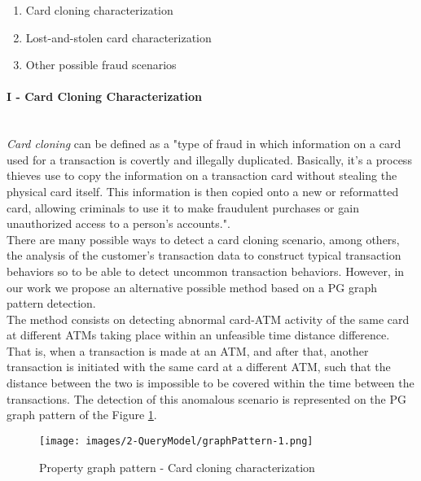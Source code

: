 \begin{enumerate}
\renewcommand{\labelenumi}{\Roman{enumi}.} %
    \item Card cloning characterization
    \item Lost-and-stolen card characterization
    \item Other possible fraud scenarios
\end{enumerate}


\paragraph{I - Card Cloning Characterization\\\\}

\emph{Card cloning} can be defined as a "type of fraud in which information on a card used for a transaction is covertly and illegally duplicated. Basically, it’s a process thieves use to copy the information on a transaction card without stealing the physical card itself. This information is then copied onto a new or reformatted card, allowing criminals to use it to make fraudulent purchases or gain unauthorized access to a person’s accounts."\cite{FP-unit21_card_cloning}.\\

There are many possible ways to detect a card cloning scenario, among others, the analysis of the customer's transaction data to construct typical transaction behaviors so to be able to detect uncommon transaction behaviors. However, in our work we propose an alternative possible method based on a PG graph pattern detection.\\

The method consists on detecting abnormal card-ATM activity of the same card at different ATMs taking place within an unfeasible time distance difference. That is, when a transaction is made at an ATM, and after that, another transaction is initiated with the same card at a different ATM, such that the distance between the two is impossible to be covered within the time between the transactions.
The detection of this anomalous scenario is represented on the PG graph pattern of the Figure \ref{img:graphPattern-1}. 

\begin{figure}[H]
  \centering
  \texttt{[image: images/2-QueryModel/graphPattern-1.png]}
  \caption{Property graph pattern - Card cloning characterization}
  \label{img:graphPattern-1}
\end{figure}

